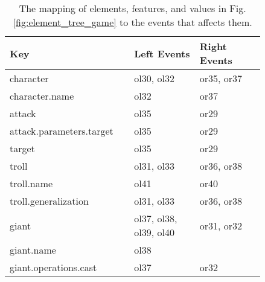 \begin{table}[]
    \centering
    \caption{The mapping of elements, features, and values in Fig. \ref{fig:element_tree_game} to the events that affects them.}
    \label{tab:keyeventsmap}
    \begin{scriptsize}
        \begin{tabular}{|m{0.38\linewidth}|m{0.23\linewidth}|m{0.23\linewidth}|}
            \hline
            \textbf{Key} & \textbf{Left Events} & \textbf{Right Events} \\ \hline
            character                          & ol30, ol32                                & or35, or37                                 \\ \hline
            character.name                     & ol32                                      & or37                                       \\ \hline
            attack                             & ol35                                      & or29                                       \\ \hline
            attack.parameters.target           & ol35                                      & or29                                       \\ \hline
            target                             & ol35                                      & or29                                       \\ \hline
            troll                              & ol31, ol33                                & or36, or38                                 \\ \hline
            troll.name                         & ol41                                      & or40                                       \\ \hline
            troll.generalization               & ol31, ol33                                & or36, or38                                 \\ \hline
            giant                              & ol37, ol38, ol39, ol40                    & or31, or32                                 \\ \hline
            giant.name                         & ol38                                      &                                            \\ \hline
            giant.operations.cast              & ol37                                      & or32                                       \\ \hline

\end{tabular}
\end{scriptsize}
\end{table}
